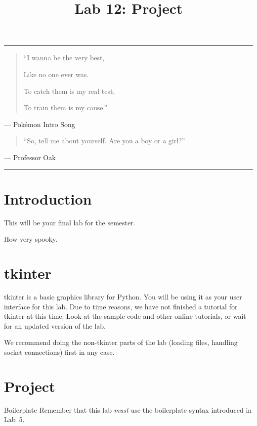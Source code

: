 \documentclass[11pt]{cselabheader}
\title{Lab 12: Project}
\begin{document}
\maketitle

\hrule
\begin{quotation}
  ``I wanna be the very best,
  
  Like no one ever was.
  
  To catch them is my real test,
  
  To train them is my cause.''
\end{quotation}
\begin{flushright}
--- Pok\'emon Intro Song
\end{flushright}


\begin{quotation}
``So, tell me about yourself. Are you a boy or a girl?''
\end{quotation}
\begin{flushright}
--- Professor Oak
\end{flushright}

\hrule

\section{Introduction}
This will be your final lab for the semester.

\vspace{4in}
How very spooky.


\pagebreak

\section{tkinter}
\label{sec:tk}
tkinter is a basic graphics library for Python. You will be using it as your
user interface for this lab. Due to time reasons, we have not finished a
tutorial for tkinter at this time. Look at the sample code and other online
tutorials, or wait for an updated version of the lab.

We recommend doing the non-tkinter parts of the lab (loading files, handling
socket connections) first in any case.

\pagebreak

\section{Project}
\label{sec:proj}

\begin{warningbox}{Boilerplate}
  Remember that this lab \emph{must} use the
  boilerplate syntax introduced in Lab~5.
\end{warningbox}
\end{document}
